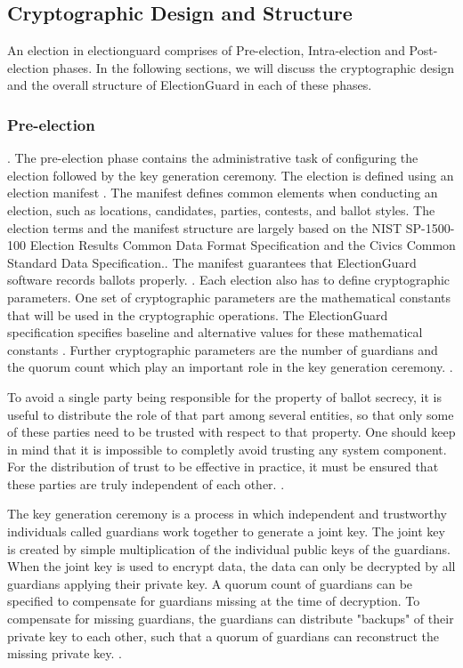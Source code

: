 \subsection{Cryptographic Design and Structure}
An election in electionguard comprises of Pre-election, Intra-election and Post-election phases. In the following sections, we will discuss the cryptographic design and the overall structure of ElectionGuard in each of these phases.

\subsubsection{Pre-election}. 
The pre-election phase contains the administrative task of configuring the election followed by the key generation ceremony. The election is defined using an election manifest \cite[7]{eg-paper}. The manifest defines common elements when conducting an election, such as locations, candidates, parties, contests, and ballot styles. The election terms and the manifest structure are largely based on the NIST SP-1500-100 Election Results Common Data Format Specification and the Civics Common Standard Data Specification.\cite{eg-docs}.  The manifest guarantees that ElectionGuard software records ballots properly. \cite[7]{eg-paper}. Each election also has to define cryptographic parameters. One set of cryptographic parameters are the mathematical constants that will be used in the cryptographic operations. The ElectionGuard specification specifies baseline and alternative values for these mathematical constants \cite[21, 36-38]{eg-spec}. Further cryptographic parameters are the number of guardians and the quorum count which play an important role in the key generation ceremony. \cite[8-9]{eg-paper}.

To avoid a single party being responsible for the property of ballot secrecy, it is useful to distribute the role of that part among several entities, so that only some of these parties need to be trusted with respect to that property. One should keep in mind that it is impossible to completly avoid trusting any system component. For the distribution of trust to be effective in practice, it must be ensured that these parties are truly independent of each other. \cite[92]{onlinee-2e-study}.

The key generation ceremony is a process in which independent and trustworthy individuals called guardians work together to generate a joint key. The joint key is created by simple multiplication of the individual public keys of the guardians. When the joint key is used to encrypt data, the data can only be decrypted by all guardians applying their private key. A quorum count of guardians can be specified to compensate for guardians missing at the time of decryption. To compensate for missing guardians, the guardians can distribute "backups" of their private key to each other, such that a quorum of guardians can reconstruct the missing private key. \cite[8]{eg-paper} \cite{eg-docs}.

